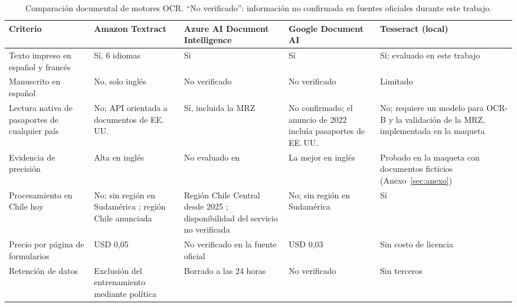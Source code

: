 \documentclass[11pt,a4paper]{article}
\begin{document}
\begin{table}[!htbp]
\centering
\caption{Comparación documental de motores OCR. ``No verificado'': información no confirmada en fuentes oficiales durante este trabajo.}
\label{tab:matriz}
\scriptsize
\begin{tabularx}{\textwidth}{>{\raggedright\arraybackslash}p{2.7cm} L L L L}
\toprule
\textbf{Criterio} & \textbf{Amazon Textract} & \textbf{Azure AI Document Intelligence} & \textbf{Google Document AI} & \textbf{Tesseract (local)} \\
\midrule
Texto impreso en español y francés & Sí, 6 idiomas \cite{awsfaq} & Sí & Sí & Sí; evaluado en este trabajo \\
Manuscrito en español & No, solo inglés \cite{awsfaq} & No verificado & No verificado & Limitado \\
Lectura nativa de pasaportes de cualquier país & No; API orientada a documentos de EE.\,UU. \cite{awsid} & Sí, incluida la MRZ \cite{azureid} & No confirmado; el anuncio de 2022 incluía pasaportes de EE.\,UU. \cite{googleid} & No; requiere un modelo para OCR-B \cite{doubango} y la validación de la MRZ, implementada en la maqueta \\
Evidencia de precisión & Alta en inglés \cite{hegghammer2022} & No evaluado en \cite{hegghammer2022} & La mejor en inglés \cite{hegghammer2022} & Probado en la maqueta con documentos ficticios (Anexo~\ref{sec:anexo}) \\
Procesamiento en Chile hoy & No; sin región en Sudamérica \cite{awsendpoints}; región Chile anunciada \cite{awschile} & Región Chile Central desde 2025 \cite{mschile}; disponibilidad del servicio no verificada & No; sin región en Sudamérica \cite{gdocairegions} & Sí \\
Precio por página de formularios & USD 0,05 \cite{awspricing} & No verificado en la fuente oficial & USD 0,03 \cite{googlepricing} & Sin costo de licencia \\
Retención de datos & Exclusión del entrenamiento mediante política \cite{awsoptout} & Borrado a las 24 horas \cite{azureprivacy} & No verificado & Sin terceros \\
\bottomrule
\end{tabularx}
\end{table}
\end{document}

